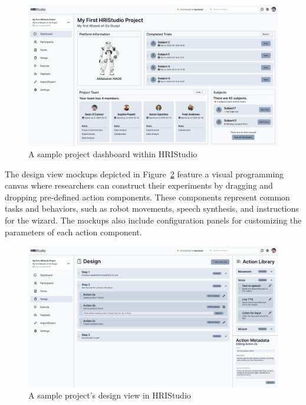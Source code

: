 \documentclass[letterpaper, 10 pt, conference]{ieeeconf}
\begin{document}
\begin{figure}[h]
    \begin{center}
        \includegraphics[width=0.4\paperwidth]{assets/mockups/dashboard}
        \vskip -0.3cm
        \caption{A sample project dashboard within HRIStudio}
        \label{fig:dashboard}
    \end{center}
    \vskip -0.4cm
\end{figure}

The design view mockups depicted in Figure~\ref{fig:design} feature a visual programming canvas where researchers can construct their experiments by dragging and dropping pre-defined action components. These components represent common tasks and behaviors, such as robot movements, speech synthesis, and instructions for the wizard. The mockups also include configuration panels for customizing the parameters of each action component.

\begin{figure}[h]
    \begin{center}
        \includegraphics[width=0.4\paperwidth]{assets/mockups/design}
         \vskip -0.3cm
        \caption{A sample project's design view in HRIStudio}
        \label{fig:design}
    \end{center}
    \vskip -0.5cm
\end{figure}
\end{document}
